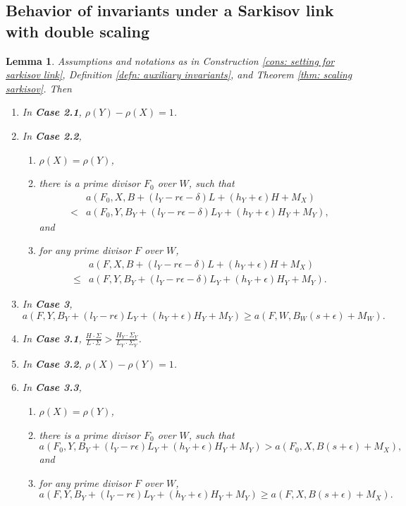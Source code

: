 \documentclass[11pt]{amsart}
\numberwithin{equation}{section}
\newtheorem{lem}[thm]{Lemma}
\theoremstyle{definition}
\theoremstyle{remark}
\theoremstyle{definition}
\begin{document}
\subsection{Behavior of invariants under a Sarkisov link with double scaling}
\begin{lem}\label{lem: sar scaling terminalization}
Assumptions and notations as in Construction \ref{cons: setting for sarkisov link}, Definition \ref{defn: auxiliary invariants}, and Theorem \ref{thm: scaling sarkisov}. Then
\begin{enumerate}
    \item In \textbf{\rm\textbf{Case 2.1}}, $\rho(Y)-\rho(X)=1$.
    \item In \textbf{\rm\textbf{Case 2.2}},
    \begin{enumerate}
        \item $\rho(X)=\rho(Y)$,
        \item there is a prime divisor $F_0$ over $W$, such that 
    \begin{align*}
        &a(F_0,X,B+(l_Y-r\epsilon-\delta)L+(h_Y+\epsilon)H+M_X)\\
        <&a(F_0,Y,B_Y+(l_Y-r\epsilon-\delta)L_Y+(h_Y+\epsilon)H_Y+M_Y),
    \end{align*}
    and
    \item for any prime divisor $F$ over $W$,
      \begin{align*}
        &a(F,X,B+(l_Y-r\epsilon-\delta)L+(h_Y+\epsilon)H+M_X)\\
        \leq &a(F,Y,B_Y+(l_Y-r\epsilon-\delta)L_Y+(h_Y+\epsilon)H_Y+M_Y).
    \end{align*}
    \end{enumerate}
    \item In \textbf{\rm\textbf{Case 3}}, $$a(F,Y,B_Y+(l_Y-r\epsilon)L_Y+(h_Y+\epsilon)H_Y+M_Y)\geq a(F,W,B_W(s+\epsilon)+M_W).$$
    \item In \textbf{\rm\textbf{Case 3.1}}, $\frac{H\cdot\Sigma}{L\cdot\Sigma}>\frac{H_Y\cdot\Sigma_Y}{L_Y\cdot\Sigma_Y}$.
    \item In \textbf{\rm\textbf{Case 3.2}}, $\rho(X)-\rho(Y)=1$.
    \item In \textbf{\rm\textbf{Case 3.3}},
    \begin{enumerate}
        \item $\rho(X)=\rho(Y)$,
        \item there is a prime divisor $F_0$ over $W$, such that 
   $$a(F_0,Y,B_Y+(l_Y-r\epsilon)L_Y+(h_Y+\epsilon)H_Y+M_Y)> a(F_0,X,B(s+\epsilon)+M_X),$$
    and
    \item for any prime divisor $F$ over $W$,
   $$a(F,Y,B_Y+(l_Y-r\epsilon)L_Y+(h_Y+\epsilon)H_Y+M_Y)\geq a(F,X,B(s+\epsilon)+M_X).$$
    \end{enumerate}
\end{enumerate}
\end{lem}
\end{document}
